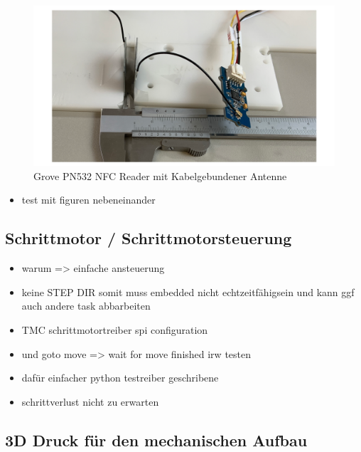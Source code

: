 \begin{figure}
\centering
\includegraphics{images/ATC_nfc_range_test.png}
\caption{Grove PN532 NFC Reader mit Kabelgebundener Antenne}
\end{figure}

\begin{itemize}
\tightlist
\item
  test mit figuren nebeneinander
\end{itemize}

\hypertarget{schrittmotor-schrittmotorsteuerung}{%
\subsection{Schrittmotor /
Schrittmotorsteuerung}\label{schrittmotor-schrittmotorsteuerung}}

\begin{itemize}
\tightlist
\item
  warum =\textgreater{} einfache ansteuerung
\item
  keine STEP DIR somit muss embedded nicht echtzeitfähigsein und kann
  ggf auch andere task abbarbeiten
\item
  TMC schrittmotortreiber spi configuration
\item
  und goto move =\textgreater{} wait for move finished irw testen
\item
  dafür einfacher python testreiber geschribene
\item
  schrittverlust nicht zu erwarten
\end{itemize}

\hypertarget{d-druck-fuxfcr-den-mechanischen-aufbau}{%
\subsection{3D Druck für den mechanischen
Aufbau}\label{d-druck-fuxfcr-den-mechanischen-aufbau}}

